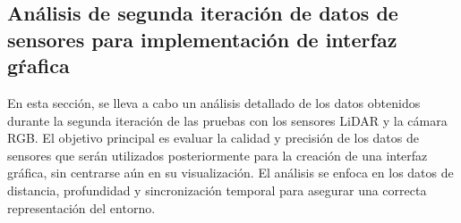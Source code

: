 \subsection{An\'alisis de segunda iteraci\'on de datos de sensores para implementaci\'on de interfaz g\'rafica} %

    En esta secci\'on, se lleva a cabo un an\'alisis detallado de los datos obtenidos durante la 
        segunda iteraci\'on de las pruebas con los sensores LiDAR y la c\'amara RGB. El objetivo 
        principal es evaluar la calidad y precisi\'on de los datos de sensores que ser\'an utilizados 
        posteriormente para la creaci\'on de una interfaz gr\'afica, sin centrarse a\'un en su visualizaci\'on. 
        El an\'alisis se enfoca en los datos de distancia, profundidad y sincronizaci\'on temporal para asegurar 
        una correcta representaci\'on del entorno.
    \vskip 0.5cm
